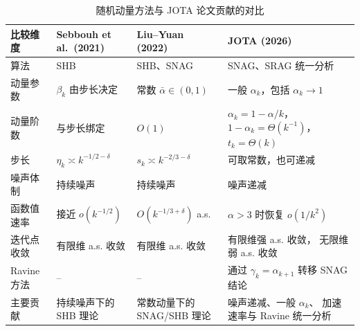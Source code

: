 \documentclass[11pt]{ctexart}
\begin{document}
\begin{table}[htbp]
    \centering
    \small
    \renewcommand{\arraystretch}{1.25}
    \caption{随机动量方法与 JOTA 论文贡献的对比}
    \label{tab:jota-contribution}
    \begin{tabularx}{\textwidth}{
        @{}
        >{\raggedright\arraybackslash}p{2.2cm}
        >{\raggedright\arraybackslash}p{3.0cm}
        >{\raggedright\arraybackslash}p{3.0cm}
        >{\raggedright\arraybackslash}X
        @{}
    }
        \toprule
        比较维度
        & Sebbouh et al.~(2021)
        & Liu--Yuan (2022)
        & JOTA (2026) \\
        \midrule

        算法
        & SHB
        & SHB、SNAG
        & SNAG、SRAG 统一分析 \\

        动量参数
        & $\beta_k$ 由步长决定
        & 常数 $\bar{\alpha}\in(0,1)$
        & 一般 $\alpha_k$，包括 $\alpha_k\to1$ \\

        动量阶数
        & 与步长绑定
        & $O(1)$
        & $\alpha_k=1-\alpha/k$，
          $1-\alpha_k=\Theta(k^{-1})$，
          $t_k=\Theta(k)$ \\

        步长
        & $\eta_k\asymp k^{-1/2-\delta}$
        & $s_k\asymp k^{-2/3-\delta}$
        & 可取常数，也可递减 \\

        噪声体制
        & 持续噪声
        & 持续噪声
        & 噪声递减 \\

        函数值速率
        & 接近 $o(k^{-1/2})$
        & $O(k^{-1/3+\delta})$ a.s.
        & $\alpha>3$ 时恢复 $o(1/k^2)$ \\

        迭代点收敛
        & 有限维 a.s. 收敛
        & 有限维 a.s. 收敛
        & 有限维强 a.s. 收敛，
          无限维弱 a.s. 收敛 \\

        Ravine 方法
        & --
        & --
        & 通过 $\gamma_k=\alpha_{k+1}$
          转移 SNAG 结论 \\

        主要贡献
        & 持续噪声下的 SHB 理论
        & 常数动量下的 SNAG/SHB 理论
        & 噪声递减、一般 $\alpha_k$、
          加速速率与 Ravine 统一分析 \\

        \bottomrule
    \end{tabularx}
\end{table}
\end{document}
